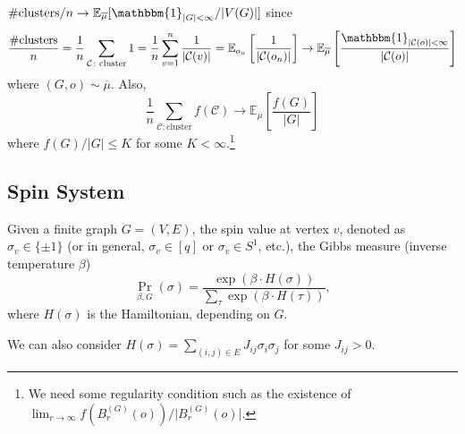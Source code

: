 \begin{note}
	\(\#\text{clusters} / n \to \mathbb{E}_{\overline{\mu} }[\mathbbm{1}_{\lvert G \rvert < \infty } / \lvert V(G) \rvert ] \) since
	\[
		\frac{\#\text{clusters}}{n}
		= \frac{1}{n} \sum_{\mathcal{C} \colon \text{cluster} } 1
		= \frac{1}{n} \sum_{v=1}^{n} \frac{1}{\lvert \mathcal{C} (v) \rvert }
		= \mathbb{E}_{o_n}\left[\frac{1}{\lvert \mathcal{C} (o_n) \rvert }\right]
		\to \mathbb{E}_{\overline{\mu} }\left[\frac{\mathbbm{1}_{\lvert \mathcal{C} (o) \rvert < \infty } }{\lvert \mathcal{C} (o) \rvert }\right]
	\]
	where \((G, o) \sim \overline{\mu} \). Also,
	\[
		\frac{1}{n} \sum_{\mathcal{C} \colon \text{cluster} } f(\mathcal{C} )
		\to \mathbb{E}_{\overline{\mu} }\left[\frac{f(G)}{\lvert G \rvert }\right]
	\]
	where \(f(G) / \lvert G \rvert \leq K\) for some \(K < \infty \).\footnote{We need some regularity condition such as the existence of \(\lim_{r \to \infty} f(B_r^{(G)}(o)) / \lvert B_r^{(G)}(o) \rvert \).}
\end{note}

\subsection{Spin System}
Given a finite graph \(G = (V, E)\), the spin value at vertex \(v\), denoted as \(\sigma _v \in \{ \pm 1 \} \) (or in general, \(\sigma _v \in [q]\) or \(\sigma _v \in S^1\), etc.), the Gibbs measure (inverse temperature \(\beta \))
\[
	\Pr_{\beta , G}(\sigma )
	= \frac{\exp (\beta \cdot H(\sigma ))}{\sum_{\tau } \exp (\beta \cdot H(\tau ))},
\]
where \(H(\sigma ) \) is the Hamiltonian, depending on \(G\).


\begin{eg}
	We can also consider \(H(\sigma ) = \sum_{(i, j) \in E} J_{ij} \sigma _i \sigma _j\) for some \(J_{ij} > 0\).
\end{eg}

